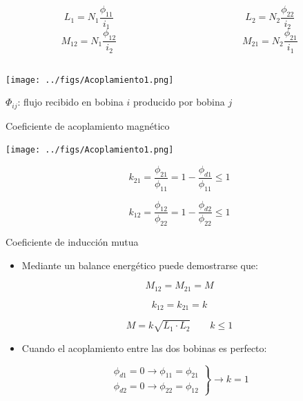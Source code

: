 \documentclass[xcolor={usenames,svgnames,dvipsnames}]{beamer}
\begin{document}
\begin{frame}[label={sec:org79aea4b},plain]{}
\begin{columns}
\begin{column}{0.5\columnwidth}
\[
  L_1 = N_1 \frac{\phi_{11}}{i_1}
\]
\[
  M_{12} = N_1 \frac{\phi_{12}}{i_2}
\]
\end{column}
\begin{column}{0.5\columnwidth}
\[
  L_2 = N_2 \frac{\phi_{22}}{i_2}
\]
\[
  M_{21} = N_2 \frac{\phi_{21}}{i_1}
\]
\end{column}
\end{columns}

\begin{center}
\texttt{[image: ../figs/Acoplamiento1.png]}
\end{center}

\begin{center}
\(\Phi_{ij}\): flujo recibido en bobina \(i\) producido por bobina \(j\)
\end{center}
\end{frame}

\begin{frame}[label={sec:orga4c712f}]{Coeficiente de acoplamiento magnético}
\begin{center}
\texttt{[image: ../figs/Acoplamiento1.png]}
\end{center}

\[
  k_{21} = \frac{\phi_{21}}{\phi_{11}} = 1 - \frac{\phi_{d1}}{\phi_{11}} \leq 1
\]

\[
  k_{12} = \frac{\phi_{12}}{\phi_{22}} = 1 - \frac{\phi_{d2}}{\phi_{22}} \leq 1
\]
\end{frame}



\begin{frame}[label={sec:orge45a45a}]{Coeficiente de inducción mutua}
\begin{itemize}
\item Mediante un balance energético puede demostrarse que:
\end{itemize}
\[
  M_{12} = M_{21} = M
\]

\[
  k_{12} = k_{21} = k
\]

\[
  \boxed{M = k \sqrt{L_1 \cdot L_2}} \qquad  k \leq 1
\]

\begin{itemize}
\item Cuando el acoplamiento entre las dos bobinas es perfecto:
\end{itemize}

\[\left.
\begin{array}{cc}
  \phi_{d1} = 0 \rightarrow   \phi_{11} = \phi_{21}\\
  \phi_{d2} = 0 \rightarrow \phi_{22} = \phi_{12} 
  \end{array} \right\} \rightarrow k = 1
\]
\end{frame}
\end{document}
